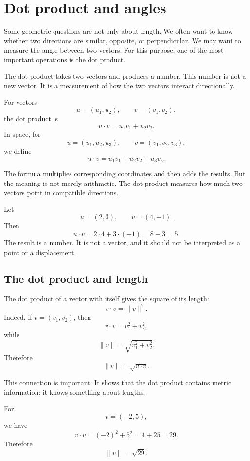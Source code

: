 \section{Dot product and angles}

Some geometric questions are not only about length. We often want to know whether two directions are similar, opposite, or perpendicular. We may want to measure the angle between two vectors. For this purpose, one of the most important operations is the dot product.

The dot product takes two vectors and produces a number. This number is not a new vector. It is a measurement of how the two vectors interact directionally.

\begin{definitionbox}
For vectors
\[
u=(u_1,u_2),
\qquad
v=(v_1,v_2),
\]
the dot product is
\[
u\cdot v=u_1v_1+u_2v_2.
\]
In space, for
\[
u=(u_1,u_2,u_3),
\qquad
v=(v_1,v_2,v_3),
\]
we define
\[
u\cdot v=u_1v_1+u_2v_2+u_3v_3.
\]
\end{definitionbox}

The formula multiplies corresponding coordinates and then adds the results. But the meaning is not merely arithmetic. The dot product measures how much two vectors point in compatible directions.

\begin{examplebox}
Let
\[
u=(2,3),
\qquad
v=(4,-1).
\]
Then
\[
u\cdot v=2\cdot4+3\cdot(-1)=8-3=5.
\]
The result is a number. It is not a vector, and it should not be interpreted as a point or a displacement.
\end{examplebox}

\subsection*{The dot product and length}

The dot product of a vector with itself gives the square of its length:
\[
v\cdot v=\lVert v\rVert^2.
\]
Indeed, if \(v=(v_1,v_2)\), then
\[
v\cdot v=v_1^2+v_2^2,
\]
while
\[
\lVert v\rVert=\sqrt{v_1^2+v_2^2}.
\]
Therefore
\[
\lVert v\rVert=\sqrt{v\cdot v}.
\]

This connection is important. It shows that the dot product contains metric information: it knows something about lengths.

\begin{examplebox}
For
\[
v=(-2,5),
\]
we have
\[
v\cdot v=(-2)^2+5^2=4+25=29.
\]
Therefore
\[
\lVert v\rVert=\sqrt{29}.
\]
\end{examplebox}

